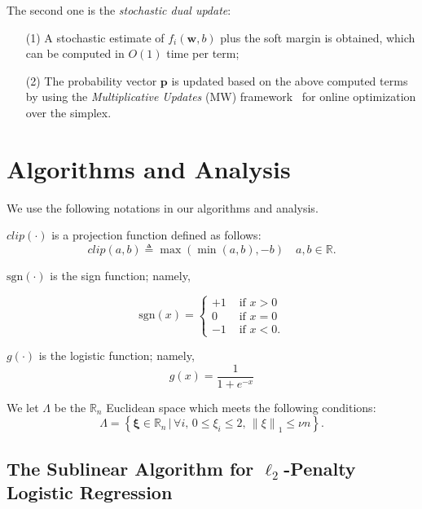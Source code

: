 \documentclass{llncs}
\newcommand{\bw}{\mathbf{w}}
\newcommand{\bp}{\mathbf{p}}
\newcommand{\bxi}{\mathbf{\xi}}
\newcommand{\lc}{\left(}
\newcommand{\rc}{\right)}
\def\sgn{\mathrm{sgn}}
\begin{document}
The second one is the \textit{stochastic dual update}:
\begin{enumerate}
\item[{(1)}] \; A stochastic estimate of $f_i(\bw,b)$ plus the soft margin is obtained, which can be computed in $O(1)$ time per term;
\item[{(2)}] \; The probability vector $\bp$ is updated based on the above computed terms by using the \textit{Multiplicative Updates} (MW) framework~\cite{arora2005multiplicative} for online optimization over the simplex.
\end{enumerate}
	
\section{Algorithms and Analysis} \label{sec:alg}

We use the following notations in our algorithms and analysis.

$clip\lc \cdot \rc$ is a projection function defined as follows:
	\[
	clip\lc a,b \rc \triangleq \max \lc \min \lc a,b \rc ,-b\rc \,\,\,\,\,\, a,b \in \mathbb{R}.
	\]

$\sgn \lc \cdot \rc$ is the sign function; namely,
	
	\[
	\sgn \lc x \rc =
		\begin{cases}
 		+1 & \text{ if } x>0  \\
 		0  & \text{ if } x=0  \\
 		-1 & \text{ if } x<0.
		\end{cases}
	\]

$g\lc \cdot \rc$ is the logistic function; namely,
	\[
	g \lc x \rc=\frac{1}{1+e^{-x}}
	\]

We let $\Lambda$ be the $\mathbb{R}_{n}$ Euclidean space which meets the following conditions:
	\[
	\Lambda=\left\{ \bxi\in\mathbb{R}_{n} \, | \, \forall i, \, 0\leq{\xi}_{i}\leq 2, \, {\|\xi \|}_{1}\leq \nu n  \right
	\}.
	\]

\subsection{The Sublinear Algorithm for $\ell_2$-Penalty Logistic Regression} \label{sec:l2alg}
	
\end{document}
